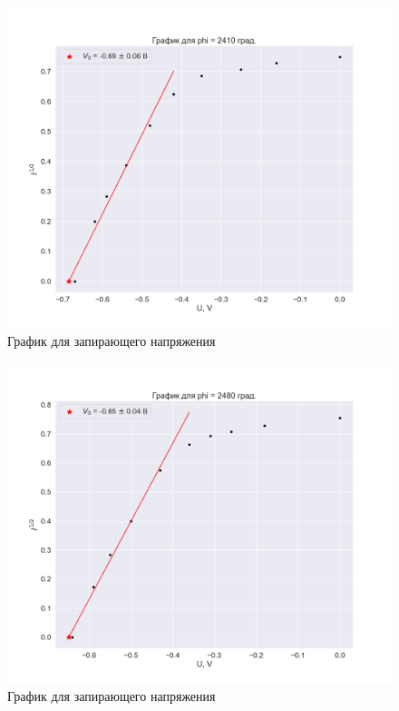 \documentclass[a4paper, 12pt]{article}
\begin{document}
\begin{figure}[H]
    \centering
    \includegraphics[width=1\textwidth]{plot_zero4.png}
    \caption{График для запирающего напряжения}
\end{figure}

\begin{figure}[H]
    \centering
    \includegraphics[width=1\textwidth]{plot_zero5.png}
    \caption{График для запирающего напряжения}
\end{figure}
\end{document}
